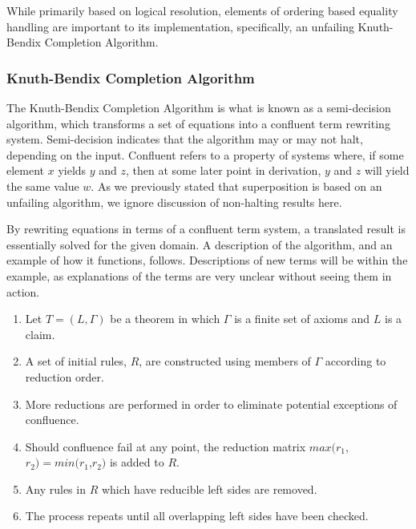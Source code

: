 While primarily based on logical resolution, elements of ordering based equality handling are important to its implementation, specifically, an unfailing Knuth-Bendix Completion Algorithm.

\subsubsection{Knuth-Bendix Completion Algorithm}

The Knuth-Bendix Completion Algorithm is what is known as a semi-decision algorithm, which transforms a set of equations into a confluent term rewriting system. Semi-decision indicates that the algorithm may or may not halt, depending on the input. Confluent refers to a property of systems where, if some element $x$ yields $y$ and $z$, then at some later point in derivation, $y$ and $z$ will yield the same value $w$. As we previously stated that superposition is based on an unfailing algorithm, we ignore discussion of non-halting results here.

By rewriting equations in terms of a confluent term system, a translated result is essentially solved for the given domain. A description of the algorithm, and an example of how it functions, follows. Descriptions of new terms will be within the example, as explanations of the terms are very unclear without seeing them in action.

\begin{enumerate}
	\item Let $T=(L,\Gamma)$ be a theorem in which $\Gamma$ is a finite set of axioms and $L$ is a claim.
	\item A set of initial rules, $R$, are constructed using members of $\Gamma$ according to reduction order.
	\item More reductions are performed in order to eliminate potential exceptions of confluence.
	\item Should confluence fail at any point, the reduction matrix $max(r_1$,$r_2)=min(r_1$,$r_2)$ is added to $R$.
	\item Any rules in $R$ which have reducible left sides are removed.
	\item The process repeats until all overlapping left sides have been checked.
\end{enumerate}

